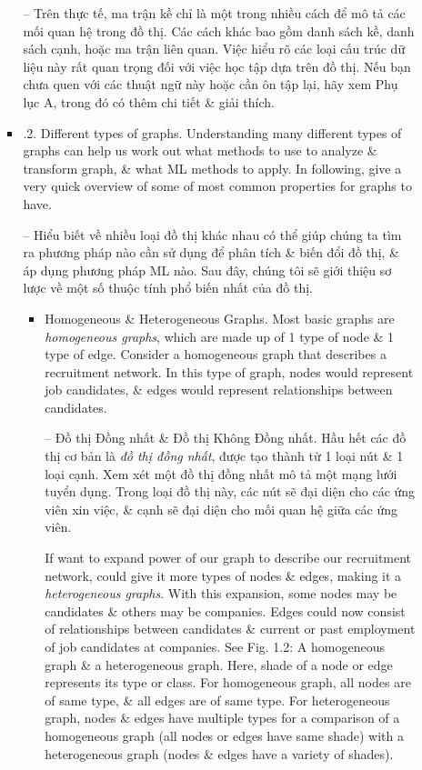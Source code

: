 \documentclass{article}
\begin{document}
\begin{itemize}
\begin{itemize}
\begin{itemize}
            -- Trên thực tế, ma trận kề chỉ là một trong nhiều cách để mô tả các mối quan hệ trong đồ thị. Các cách khác bao gồm danh sách kề, danh sách cạnh, hoặc ma trận liên quan. Việc hiểu rõ các loại cấu trúc dữ liệu này rất quan trọng đối với việc học tập dựa trên đồ thị. Nếu bạn chưa quen với các thuật ngữ này hoặc cần ôn tập lại, hãy xem Phụ lục A, trong đó có thêm chi tiết \& giải thích.
            \item {.2. Different types of graphs.} Understanding many different types of graphs can help us work out what methods to use to analyze \& transform graph, \& what ML methods to apply. In following, give a very quick overview of some of most common properties for graphs to have.

            -- Hiểu biết về nhiều loại đồ thị khác nhau có thể giúp chúng ta tìm ra phương pháp nào cần sử dụng để phân tích \& biến đổi đồ thị, \& áp dụng phương pháp ML nào. Sau đây, chúng tôi sẽ giới thiệu sơ lược về một số thuộc tính phổ biến nhất của đồ thị.
            \begin{itemize}
                \item {\sf Homogeneous \& Heterogeneous Graphs.} Most basic graphs are {\it homogeneous graphs}, which are made up of 1 type of node \& 1 type of edge. Consider a homogeneous graph that describes a recruitment network. In this type of graph, nodes would represent job candidates, \& edges would represent relationships between candidates.

                -- {\sf Đồ thị Đồng nhất \& Đồ thị Không Đồng nhất.} Hầu hết các đồ thị cơ bản là {\it đồ thị đồng nhất}, được tạo thành từ 1 loại nút \& 1 loại cạnh. Xem xét một đồ thị đồng nhất mô tả một mạng lưới tuyển dụng. Trong loại đồ thị này, các nút sẽ đại diện cho các ứng viên xin việc, \& cạnh sẽ đại diện cho mối quan hệ giữa các ứng viên.

                If want to expand power of our graph to describe our recruitment network, could give it more types of nodes \& edges, making it a {\it heterogeneous graphs}. With this expansion, some nodes may be candidates \& others may be companies. Edges could now consist of relationships between candidates \& current or past employment of job candidates at companies. See {\sf Fig. 1.2: A homogeneous graph \& a heterogeneous graph. Here, shade of a node or edge represents its type or class. For homogeneous graph, all nodes are of same type, \& all edges are of same type. For heterogeneous graph, nodes \& edges have multiple types} for a comparison of a homogeneous graph (all nodes or edges have same shade) with a heterogeneous graph (nodes \& edges have a variety of shades).


\end{itemize}
\end{itemize}
\end{itemize}
\end{itemize}
\end{document}
